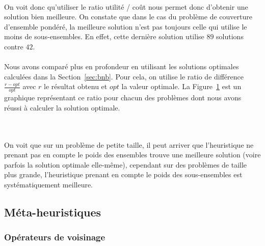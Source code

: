 \documentclass[12pt,letterpaper,twoside]{article}
\begin{document}
			\paragraph*{}
				On voit donc qu'utiliser le ratio utilité / coût nous permet donc d'obtenir une solution bien meilleure.
				On constate que dans le cas du problème de couverture d'ensemble pondéré, la meilleure solution n'est pas
				toujours celle qui utilise le moins de sous-ensembles. En effet, cette dernière solution utilise \(89\) solutions contre \(42\).

			\paragraph*{}
				Nous avons comparé plus en profondeur en utilisant les solutions optimales calculées dans la Section~\ref{sec:bnb}.
				Pour cela, on utilise le ratio de différence \(\frac{r - opt}{opt}\) avec \(r\) le résultat obtenu et \(opt\) la
				valeur optimale.
				La Figure~\ref{fig:plots/greedy-diff} est un graphique représentant ce ratio pour chacun des problèmes
				dont nous avons réussi à calculer la solution optimale.

			\begin{figure}[H]
				\centering
				\\
				\caption{}
				\label{fig:plots/greedy-diff}
			\end{figure}

			\paragraph*{}
				On voit que sur un problème de petite taille, il peut arriver que l'heuristique ne prenant pas en compte le poids
				des ensembles trouve une meilleure solution (voire parfois la solution optimale elle-même), cependant
				sur des problèmes de taille plus grande, l'heuristique prenant en compte le poids des sous-ensembles est
				systématiquement meilleure.

		\subsection{Méta-heuristiques}
			\subsubsection{Opérateurs de voisinage}
\end{document}
